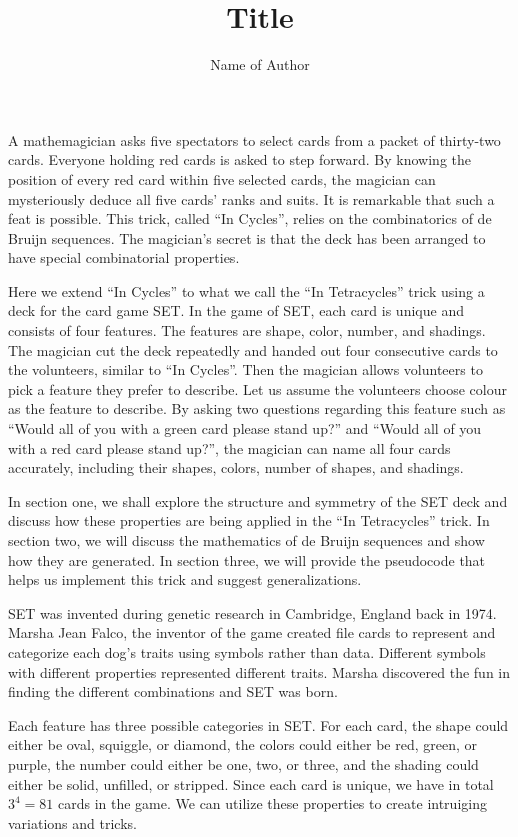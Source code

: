 \documentclass{article}
\title{Title}
\author{Name of Author}
\begin{document}
\maketitle

A mathemagician asks five spectators to select cards from a packet of thirty-two cards. Everyone holding red cards is asked to step forward. By knowing the position of every red card within five selected cards, the magician can mysteriously deduce all five cards’ ranks and suits. It is remarkable that such a feat is possible. This trick, called “In Cycles”, relies on the combinatorics of de Bruijn sequences. The magician’s secret is that the deck has been arranged to have special combinatorial properties.

Here we extend “In Cycles” to what we call the “In Tetracycles” trick using a deck for the card game SET. In the game of SET, each card is unique and consists of four features. The features are shape, color, number, and shadings. The magician cut the deck repeatedly and handed out four consecutive cards to the volunteers, similar to “In Cycles”. Then the magician allows volunteers to pick a feature they prefer to describe. Let us assume the volunteers choose colour as the feature to describe. By asking two questions regarding this feature such as “Would all of you with a green card please stand up?” and “Would all of you with a red card please stand up?”, the magician can name all four cards accurately, including their shapes, colors, number of shapes, and shadings.

In section one, we shall explore the structure and symmetry of the SET deck and discuss how these properties are being applied in the “In Tetracycles” trick. In section two, we will discuss the mathematics of de Bruijn sequences and show how they are generated. In section three, we will provide the pseudocode that helps us implement this trick and suggest generalizations.

\newpage

SET was invented during genetic research in Cambridge, England back in 1974. Marsha Jean Falco, the inventor of the game created file cards to represent and categorize each dog’s traits using symbols rather than data. Different symbols with different properties represented different traits. Marsha discovered the fun in finding the different combinations and SET was born.

Each feature has three possible categories in SET. For each card, the shape could either be oval, squiggle, or diamond, the colors could either be red, green, or purple, the number could either be one, two, or three, and the shading could either be solid, unfilled, or stripped. Since each card is unique, we have in total $3^4=81$ cards in the game. We can utilize these properties to create intruiging variations and tricks.
\end{document}
